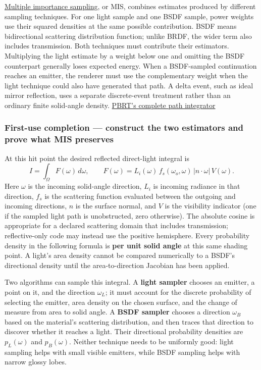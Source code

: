 \hyperref[appendix-ca8898faf1a6]{Multiple importance sampling}, or MIS, combines estimates produced by different sampling techniques. For one light sample and one BSDF sample, power weights use their squared densities at the same possible contribution. BSDF means bidirectional scattering distribution function; unlike BRDF, the wider term also includes transmission. Both techniques must contribute their estimators. Multiplying the light estimate by a weight below one and omitting the BSDF counterpart generally loses expected energy. When a BSDF-sampled continuation reaches an emitter, the renderer must use the complementary weight when the light technique could also have generated that path. A delta event, such as ideal mirror reflection, uses a separate discrete-event treatment rather than an ordinary finite solid-angle density. \href{https://pbr-book.org/4ed/Light_Transport_I_Surface_Reflection/A_Better_Path_Tracer}{PBRT's complete path integrator}

\subsubsection{First-use completion --- construct the two estimators and prove what MIS preserves}\label{03-visual-computing-i-ch007-first-use-completion-construct-the-two-estimators-and-prove-what-mis-preserves}

\hypertarget{03-visual-computing-i-ch007-first-use-completion-construct-the-two-estimators-and-prove-what-mis-preserves}{}

At this hit point the desired reflected direct-light integral is \[
I=\int_{\Omega}F(\omega)\,d\omega,\qquad
F(\omega)=L_i(\omega)\,f_s(\omega_o,\omega)\,
  |n\cdot\omega|\,V(\omega).
\] Here \(\omega\) is the incoming solid-angle direction, \(L_i\) is incoming radiance in that direction, \(f_s\) is the scattering function evaluated between the outgoing and incoming directions, \(n\) is the surface normal, and \(V\) is the visibility indicator (one if the sampled light path is unobstructed, zero otherwise). The absolute cosine is appropriate for a declared scattering domain that includes transmission; reflective-only code may instead use the positive hemisphere. Every probability density in the following formula is \textbf{per unit solid angle} at this same shading point. A light's area density cannot be compared numerically to a BSDF's directional density until the area-to-direction Jacobian has been applied.

Two algorithms can sample this integral. A \textbf{light sampler} chooses an emitter, a point on it, and the direction \(\omega_L\); it must account for the discrete probability of selecting the emitter, area density on the chosen surface, and the change of measure from area to solid angle. A \textbf{BSDF sampler} chooses a direction \(\omega_B\) based on the material's scattering distribution, and then traces that direction to discover whether it reaches a light. Their directional probability densities are \(p_L(\omega)\) and \(p_B(\omega)\). Neither technique needs to be uniformly good: light sampling helps with small visible emitters, while BSDF sampling helps with narrow glossy lobes.

